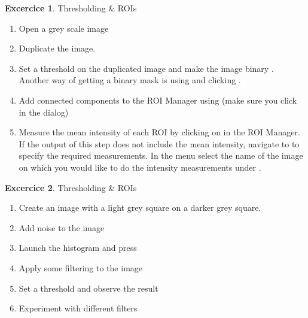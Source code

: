 \documentclass[xcolor=table]{scrartcl}
\theoremstyle{definition}
\newtheorem{exercice}{Excercice}
\begin{document}
\begin{exercice} Thresholding \& ROIs
  \begin{enumerate}
  \item Open a grey scale image
  \item Duplicate the image.
  \item Set a threshold on the duplicated image and make the image binary . Another way of getting a binary mask is using  and clicking . 
  \item Add connected components to the ROI Manager using  (make sure you click  in the  dialog)
  \item Measure the mean intensity of each ROI by clicking on  in the ROI Manager. If the output of this step does not include the mean intensity, navigate to  to specify the required measurements. In the  menu select the name of the image on which you would like to do the intensity measurements under .
  
  \end{enumerate}
\end{exercice}

\begin{exercice} Thresholding \& ROIs
  \begin{enumerate}
     \item Create an image with a light grey square on a darker grey
      square.
    \item Add noise to the image
    \item Launch the histogram and press 
    \item Apply some filtering to the image
    \item Set a threshold and observe the result
    \item  Experiment with different filters
  \end{enumerate}
\end{exercice}
\end{document}
